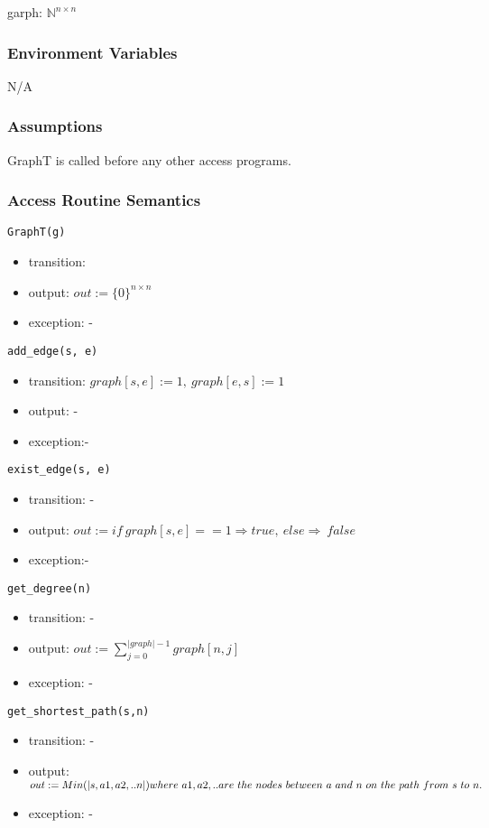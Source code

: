 \documentclass[12pt, titlepage]{article}
\begin{document}
garph: ${\mathbb{N}}^ {n\times n}$ 


\subsubsection{Environment Variables}

N/A

\subsubsection{Assumptions}


{GraphT} is called before any other access programs.



\subsubsection{Access Routine Semantics}

\noindent \texttt{GraphT(g)}
\begin{itemize}
\item transition: 
\item output: $out:= \{0\}^{n \times n}$
\item exception: -
\end{itemize}

\noindent \texttt{add\_edge(s, e)}
\begin{itemize}
\item transition: $graph[s,e]:=1,\ graph[e,s]:=1$
\item output: -
\item exception:-  
\end{itemize}

\noindent \texttt{exist\_edge(s, e)}
\begin{itemize}
\item transition: -
\item output: $out:= if\ graph[s,e] ==1\Rightarrow true,\ else\Rightarrow\ false$
\item exception:-  
\end{itemize}

\noindent \texttt{get\_degree(n)}
\begin{itemize}
\item transition: -
\item output: $out:= {\sum_{j=0}^{|graph|-1}{graph[n,j]}}$
\item exception: -
\end{itemize}

\noindent \texttt{get\_shortest\_path(s,n)}
\begin{itemize}
\item transition: -
\item output: $out:=Min(|s,a1,a2,..n|) \\where\ a1, a2, .. are\ the\ nodes\ between\ a\ and\ n\ on\ the\ path\ from\ s\ to\ n.$
\item exception: -   
\end{itemize}
\end{document}
